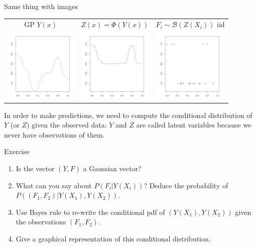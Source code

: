 \documentclass{beamer}
\begin{document}
\begin{frame}{}
Same thing with images\\
 \begin{tabular}{ccc}
  GP $Y(x)$ & $Z(x)=\Phi(Y(x))$ & $F_i \sim \mathcal{B}(Z(X_i))$ iid \\
  \includegraphics[height=3.5cm]{figures/R/classif_GP.pdf} & 
  \includegraphics[height=3.5cm]{figures/R/classif_phiGP.pdf} &
  \includegraphics[height=3.5cm]{figures/R/classif_datasmall.pdf} \\
 \end{tabular}
\end{frame}

\begin{frame}{}
In order to make predictions, we need to compute the conditional distribution of $Y$ (or $Z$) given the observed data: $Y$ and $Z$ are called latent variables because we never have observations of them.\\
\vspace{5mm}
\begin{exampleblock}{Exercise}
	\begin{enumerate}
		\item Is the vector $(Y,F)$ a Gaussian vector?
		\item What can you say about $P(F_i|Y(X_i))$? Deduce the probability of $P((F_1,F_2)|Y(X_1),Y(X_2))$. 
		\item Use Bayes rule to re-write the conditional pdf of $(Y(X_1),Y(X_2))$ given the observations $(F_1,F_2)$.
		\item Give a graphical representation of this conditional distribution. 
	\end{enumerate}
\end{exampleblock}
\end{frame}
\end{document}
